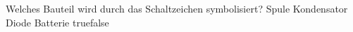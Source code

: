     {Welches Bauteil wird durch das Schaltzeichen symbolisiert?}
    {Spule}
    {Kondensator}
    {Diode}
    {Batterie}
    {true}{false}